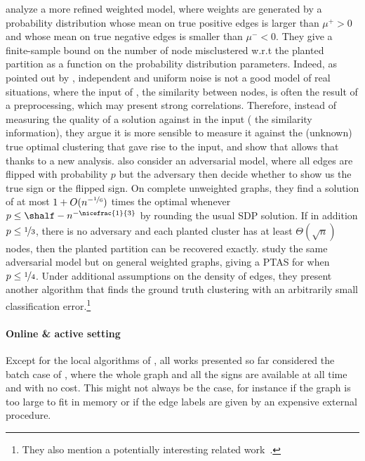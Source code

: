 \Textcite{Joachims2005} analyze a more refined weighted model, where weights are generated by a
probability distribution whose mean on true positive edges is larger than $\mu^+>0$ and whose mean
on true negative edges is smaller than $\mu^-<0$. They give a finite-sample bound on the number of
node misclustered w.r.t the planted partition as a function on the probability distribution
parameters. Indeed, as pointed out by \textcite{plantedAilon09}, independent and uniform noise is
not a good model of real situations, where the input of \pcc{}, \ie{} the similarity between nodes,
is often the result of a preprocessing, which may present strong correlations. Therefore, instead of
measuring the quality of a solution against in the input (\ie{} the similarity information), they
argue it is more sensible to measure it against the (unknown) true optimal clustering that gave rise
to the input, and show that \ccpivot{} allows that thanks to a new analysis. \Textcite{Mathieu2010}
also consider an adversarial model, where all edges are flipped with probability $p$ but the
adversary then decide whether to show us the true sign or the flipped sign. On complete unweighted
graphs, they find a solution of \mind{} at most $1 + O(n^{-\nicefrac{1}{6}})$ times the optimal
whenever $p \leq \shalf - n^{-\nicefrac{1}{3}}$ by rounding the usual SDP solution. If in addition
$p\leq\nicefrac{1}{3}$, there is no adversary and each planted cluster has at least
$\Theta(\sqrt{n})$ nodes, then the planted partition can be recovered exactly.
\Textcite{Makarychev2014} study the same adversarial model but on general weighted graphs, giving a PTAS
for \mind{} when $p\leq \nicefrac{1}{4}$. Under additional assumptions on the density of edges, they
present another algorithm that finds the ground truth clustering with an arbitrarily small
classification error.\footnote{They also mention a potentially interesting related
work~\autocite{unobservedCC14}.} %


\paragraph{Online \& active setting}

Except for the local algorithms of \textcite{Bonchi2013}, all works presented so far considered the
batch case of \pcc{}, where the whole graph and all the signs are available at all time and with no
cost. This might not always be the case, for instance if the graph is too large to fit in memory or
if the edge labels are given by an expensive external procedure.

